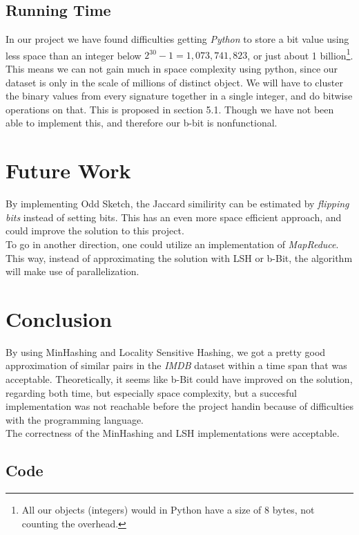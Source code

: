 \documentclass[a4paper,11pt]{article}
\begin{document}
\subsection{Running Time}
In our project we have found difficulties getting \emph{Python} to store a bit value using less space than an integer below $2^{30}-1 = 1,073,741,823$, or just about 1 billion\footnote{All our objects (integers) would in Python have a size of 8 bytes, not counting the overhead.}. This means we can not gain much in space complexity using python, since our dataset is only in the scale of millions of distinct object. We will have to cluster the binary values from every signature together in a single integer, and do bitwise operations on that. This is proposed in \cite{article:bbit} section 5.1. Though we have not been able to implement this, and therefore our b-bit is nonfunctional. \\


\section{Future Work}
By implementing Odd Sketch, the Jaccard similirity can be estimated by \emph{flipping bits} instead of setting bits. This has an even more space efficient approach, and could improve the solution to this project. \\

To go in another direction, one could utilize an implementation of \emph{MapReduce}. This way, instead of approximating the solution with LSH or b-Bit, the algorithm will make use of parallelization. \\


\section{Conclusion}
By using MinHashing and Locality Sensitive Hashing, we got a pretty good approximation of similar pairs in the \emph{IMDB} dataset within a time span that was acceptable. Theoretically, it seems like b-Bit could have improved on the solution, regarding both time, but especially space complexity, but a succesful implementation was not reachable before the project handin because of difficulties with the programming language. \\

The correctness of the MinHashing and LSH implementations were acceptable. \\


\newpage

\begin{appendices}
\section{Code}

\end{appendices}
\end{document}
